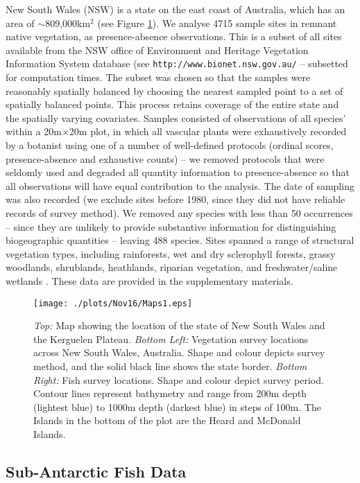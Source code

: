 \documentclass{statsoc}
\begin{document}
New South Wales (NSW) is a state on the east coast of Australia, which has an area of $\sim$809,000km$^2$ (see Figure \ref{figMap}). We analyse 4715 sample sites in remnant native vegetation, as presence-absence observations. This is a subset of all sites available from the NSW office of Environment and Heritage Vegetation Information System database (see \verb|http://www.bionet.nsw.gov.au/| -- subsetted for computation times. The subset was chosen so that the samples were reasonably spatially balanced by choosing the nearest sampled point to a set of spatially balanced points. This process retains coverage of the entire state and the spatially varying covariates. Samples consisted of observations of all species' within a 20m$\times$20m plot, in which all vascular plants were exhaustively recorded by a botanist using one of a number of well-defined protocols (ordinal scores, presence-absence and exhaustive counts) -- we removed protocols that were seldomly used and degraded all quantity information to presence-absence so that all observations will have equal contribution to the analysis. The date of sampling was also recorded (we exclude sites before 1980, since they did not have reliable records of survey method). We removed any species with less than 50 occurrences -- since they are unlikely to provide substantive information for distinguishing biogeographic quantities -- leaving 488 species. Sites spanned a range of structural vegetation types, including rainforests, wet and dry sclerophyll forests, grassy woodlands, shrublands, heathlands, riparian vegetation, and freshwater/saline wetlands \citep{kei04}. These data are provided in the supplementary materials.
\begin{figure}
	\centering
	\texttt{[image: ./plots/Nov16/Maps1.eps]}
	\caption{\label{figMap}\textit{Top:} Map showing the location of the state of New South Wales and the Kerguelen Plateau. \textit{Bottom Left:} Vegetation survey locations across New South Wales, Australia. Shape and colour depicts survey method, and the solid black line shows the state border. \textit{Bottom Right:} Fish survey locations. Shape and colour depict survey period. Contour lines represent bathymetry and range from 200m depth (lightest blue) to 1000m depth (darkest blue) in steps of 100m. The Islands in the bottom of the plot are the Heard and McDonald Islands.}
\end{figure}

\subsection{Sub-Antarctic Fish Data}\label{ss:fishData}
\end{document}
